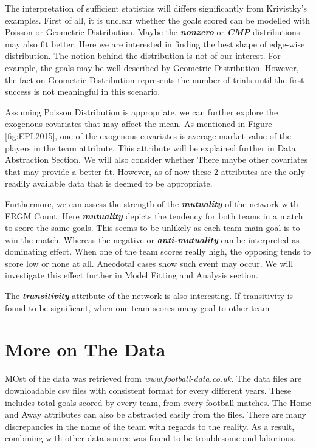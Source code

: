\documentclass[12pt,a4paper,twoside,openany]{book}\usepackage[]{graphicx}\usepackage[]{color}
\newcommand{\BI}[1]{\textit{\textbf{#1}}}
\begin{document}
The interpretation of sufficient statistics will differs significantly from Krivistky's examples. 
First of all, it is unclear whether the goals scored can be modelled with Poisson or Geometric Distribution.
Maybe the \BI{nonzero} or \BI{CMP} distributions may also fit better. 
Here we are interested in finding the best shape of edge-wise distribution.
The notion behind the distribution is not of our interest.
For example, the goals may be well described by Geometric Distribution. 
However, the fact on Geometric Distribution represents the number of trials until the first success is not meaningful in this scenario.

Assuming Poisson Distribution is appropriate, we can further explore the exogenous covariates that may affect the mean. 
As mentioned in Figure \ref{fig:EPL2015}, one of the exogenous covariates is average market value of the players in the team attribute. 
This attribute will be explained further in Data Abstraction Section.
We will also consider whether 
There maybe other covariates that may provide a better fit.
However, as of now these 2 attributes are the only readily available data that is deemed to be appropriate.

Furthermore, we can assess the strength of the \BI{mutuality} of the network with ERGM Count.
Here \BI{mutuality} depicts the tendency for both teams in a match to score the same goals.
This seems to be unlikely as each team main goal is to win the match. 
Whereas the negative or \BI{anti-mutuality} can be interpreted as dominating effect.
When one of the team scores really high, the opposing tends to score low or none at all.
Anecdotal cases show such event may occur. 
We will investigate this effect further in Model Fitting and Analysis section.

The \BI{transitivity} attribute of the network is also interesting. 
If transitivity is found to be significant, when one team scores many goal to other team  

\section{More on The Data}
MOst of the data was retrieved from \textit{www.football-data.co.uk}.
The data files are downloadable csv files with consistent format for every different years.
These includes total goals scored by every team, from every football matches. 
The Home and Away attributes can also be abstracted easily from the files. 
There are many discrepancies in the name of the team with regards to the reality.
As a result, combining with other data source was found to be troublesome and laborious.
\end{document}
